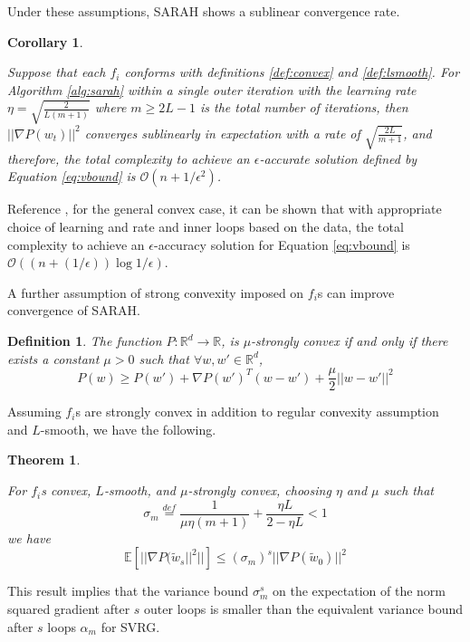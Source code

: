 \documentclass[letterpaper,11 pt]{article}
\newtheorem{theorem}{Theorem}
\newtheorem{corollary}{Corollary}
\newtheorem{definition}{Definition}
\begin{document}
Under these assumptions, SARAH shows a sublinear convergence rate.

\begin{corollary}\label{def:sublinconvergence}

Suppose that each $f_{i}$ conforms with definitions \ref{def:convex} and \ref{def:lsmooth}. For Algorithm \ref{alg:sarah} within a single outer iteration with the learning rate $\eta=\sqrt{ \frac{2}{L(m+1)} }$ where $m \geq 2L-1$ is the total number of iterations, then $||\nabla P(w_{t})||^2$ converges sublinearly in expectation with a rate of $\sqrt{ \frac{2L}{m+1}}$, and therefore, the total complexity to achieve an $\epsilon$-accurate solution defined by Equation \ref{eq:vbound} is $\mathcal{O}(n+1/\epsilon^{2})$.

\end{corollary}

Reference \cite{nguyen}, for the general convex case, it can be shown that with appropriate choice of learning and rate and inner loops based on the data, the total complexity to achieve an $\epsilon$-accuracy solution for Equation \ref{eq:vbound} is $\mathcal{O}((n+(1/\epsilon))\log{1/\epsilon})$.

A further assumption of strong convexity imposed on $f_{i}$s can improve convergence of SARAH.

\begin{definition}\label{def:sconvex}
The function $P:\mathbb{R}^{d} \rightarrow \mathbb{R}$, is $\mu$-strongly convex if and only if there exists a constant $\mu > 0$ such that $\forall w,w' \in \mathbb{R}^{d}$,
\[
P(w) \geq P(w') + \nabla P(w')^{T} (w-w') + \frac{\mu}{2} ||w - w' ||^{2}
\]
\end{definition}

Assuming $f_{i}$s are strongly convex in addition to regular convexity assumption and $L$-smooth, we have the following.

\begin{theorem}\label{thm:sarvar}

For $f_{i}$s convex, $L$-smooth, and $\mu$-strongly convex, choosing $\eta$ and $\mu$ such that
\[
\sigma_{m}\stackrel{def}{=}\frac{1}{\mu\eta(m+1)}+\frac{\eta L}{2-\eta L}<1
\]
we have
\[
\mathbb{E}[||\nabla P(\tilde{w}_{s}||^{2}||] \leq  (\sigma_{m})^{s} || \nabla P ( \tilde{w}_{0} ) ||^{2}
\]

\end{theorem}

This result implies that the variance bound $\sigma_{m}^{s}$ on the expectation of the norm squared gradient after $s$ outer loops is smaller than the equivalent variance bound after $s$ loops $\alpha_{m}$ for SVRG.
\end{document}
